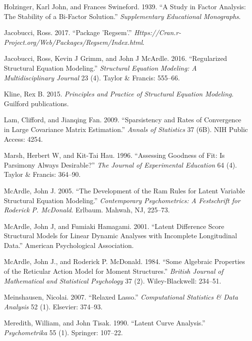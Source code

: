 \documentclass[article]{jss}
\begin{document}
\hypertarget{ref-holzinger1939study}{}
Holzinger, Karl John, and Frances Swineford. 1939. ``A Study in Factor
Analysis: The Stability of a Bi-Factor Solution.'' \emph{Supplementary
Educational Monographs}.

\hypertarget{ref-jacobucci2016package}{}
Jacobucci, Ross. 2017. ``Package 'Regsem'.''
\emph{Https://Cran.r-Project.org/Web/Packages/Regsem/Index.html}.

\hypertarget{ref-jacobucci2016regularized}{}
Jacobucci, Ross, Kevin J Grimm, and John J McArdle. 2016. ``Regularized
Structural Equation Modeling.'' \emph{Structural Equation Modeling: A
Multidisciplinary Journal} 23 (4). Taylor \& Francis: 555--66.

\hypertarget{ref-kline2015principles}{}
Kline, Rex B. 2015. \emph{Principles and Practice of Structural Equation
Modeling}. Guilford publications.

\hypertarget{ref-lam2009sparsistency}{}
Lam, Clifford, and Jianqing Fan. 2009. ``Sparsistency and Rates of
Convergence in Large Covariance Matrix Estimation.'' \emph{Annals of
Statistics} 37 (6B). NIH Public Access: 4254.

\hypertarget{ref-marsh1996assessing}{}
Marsh, Herbert W, and Kit-Tai Hau. 1996. ``Assessing Goodness of Fit: Is
Parsimony Always Desirable?'' \emph{The Journal of Experimental
Education} 64 (4). Taylor \& Francis: 364--90.

\hypertarget{ref-mcardle2005}{}
McArdle, John J. 2005. ``The Development of the Ram Rules for Latent
Variable Structural Equation Modeling.'' \emph{Contemporary
Psychometrics: A Festschrift for Roderick P. McDonald}. Erlbaum. Mahwah,
NJ, 225--73.

\hypertarget{ref-mcardle2001latent}{}
McArdle, John J, and Fumiaki Hamagami. 2001. ``Latent Difference Score
Structural Models for Linear Dynamic Analyses with Incomplete
Longitudinal Data.'' American Psychological Association.

\hypertarget{ref-McArdle_1984}{}
McArdle, John J., and Roderick P. McDonald. 1984. ``Some Algebraic
Properties of the Reticular Action Model for Moment Structures.''
\emph{British Journal of Mathematical and Statistical Psychology} 37
(2). Wiley-Blackwell: 234--51.

\hypertarget{ref-meinshausen2007relaxed}{}
Meinshausen, Nicolai. 2007. ``Relaxed Lasso.'' \emph{Computational
Statistics \& Data Analysis} 52 (1). Elsevier: 374--93.

\hypertarget{ref-meredith1990latent}{}
Meredith, William, and John Tisak. 1990. ``Latent Curve Analysis.''
\emph{Psychometrika} 55 (1). Springer: 107--22.
\end{document}
